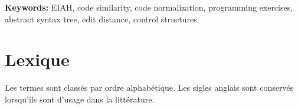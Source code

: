 \documentclass[12pt,a4paper,oneside]{report}
\begin{document}
\vspace{2\baselineskip}
\noindent\textbf{Keywords:} EIAH, code similarity, code normalization, 
programming exercises, abstract syntax tree, edit distance, 
control structures.


\tableofcontents
\listoffigures
\listoftables

\chapter*{Lexique}

Les termes sont classés par ordre alphabétique. Les sigles anglais sont conservés lorsqu'ils sont d'usage dans la littérature.
\end{document}
